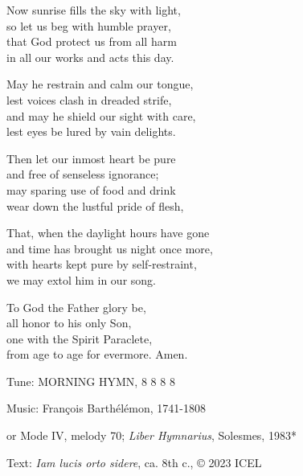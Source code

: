 \hymn

\begin{hymnverse}
Now sunrise fills the sky with light,\\
so let us beg with humble prayer,\\
that God protect us from all harm\\
in all our works and acts this day.

May he restrain and calm our tongue,\\
lest voices clash in dreaded strife,\\
and may he shield our sight with care,\\
lest eyes be lured by vain delights.

Then let our inmost heart be pure\\
and free of senseless ignorance;\\
may sparing use of food and drink\\
wear down the lustful pride of flesh,

That, when the daylight hours have gone\\
and time has brought us night once more,\\
with hearts kept pure by self-restraint,\\
we may extol him in our song.

To God the Father glory be,\\
all honor to his only Son,\\
one with the Spirit Paraclete,\\
from age to age for evermore. Amen.
\end{hymnverse}

\begin{hymnsource}
Tune: MORNING HYMN, 8 8 8 8

Music: François Barthélémon, 1741-1808

or Mode IV, melody 70; \emph{Liber Hymnarius}, Solesmes, 1983*

Text: \emph{Iam lucis orto sidere}, ca. 8th c., © 2023 ICEL
\end{hymnsource}